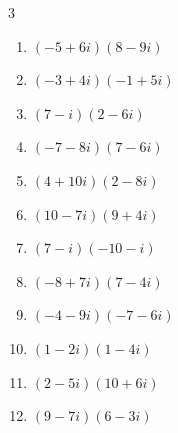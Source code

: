 \begin{multicols}{3}
\begin{enumerate}
        \phantom{$\displaystyle =-23-31i$}

  \item $\displaystyle (-5+6i)(8-9i)$

        \phantom{$\displaystyle =14+93i$}

  \item $\displaystyle (-3+4i)(-1+5i)$

        \phantom{$\displaystyle =-17-19i$}

\columnbreak %

\resetques

  \item $\displaystyle (7-i)(2-6i)$

        \phantom{$\displaystyle =8-44i$}

  \item $\displaystyle (-7-8i)(7-6i)$

        \phantom{$\displaystyle =-97-14i$}

  \item $\displaystyle (4+10i)(2-8i)$

        \phantom{$\displaystyle =88-12i$}

  \item $\displaystyle (10-7i)(9+4i)$

        \phantom{$\displaystyle =118-23i$}

  \item $\displaystyle (7-i)(-10-i)$

        \phantom{$\displaystyle =-71+3i$}

  \item $\displaystyle (-8+7i)(7-4i)$

        \phantom{$\displaystyle =-28+81i$}

  \item $\displaystyle (-4-9i)(-7-6i)$

        \phantom{$\displaystyle =-26+87i$}

  \item $\displaystyle (1-2i)(1-4i)$

        \phantom{$\displaystyle =-7-6i$}

  \item $\displaystyle (2-5i)(10+6i)$

        \phantom{$\displaystyle =50-38i$}

  \item $\displaystyle (9-7i)(6-3i)$

        \phantom{$\displaystyle =33-69i$}


\end{enumerate}
\end{multicols}
